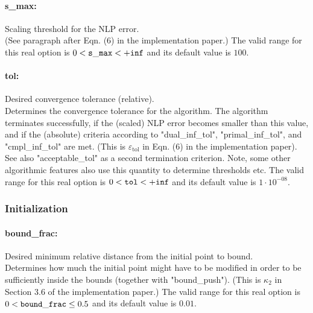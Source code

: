 \paragraph{s\_max:}\label{sec:s_max} Scaling threshold for the NLP error. $\;$ \\
 (See paragraph after Eqn. (6) in the
implementation paper.) The valid range for this real option is 
$0 <  {\tt s\_max } <  {\tt +inf}$
and its default value is $100$.


\paragraph{tol:}\label{sec:tol} Desired convergence tolerance (relative). $\;$ \\
 Determines the convergence tolerance for the
algorithm.  The algorithm terminates
successfully, if the (scaled) NLP error becomes
smaller than this value, and if the (absolute)
criteria according to "dual\_inf\_tol",
"primal\_inf\_tol", and "cmpl\_inf\_tol" are met.
 (This is $\varepsilon_\mathrm{tol}$ in Eqn. (6) in
the implementation paper).  See also
"acceptable\_tol" as a second termination
criterion.  Note, some other algorithmic features
also use this quantity to determine thresholds
etc. The valid range for this real option is 
$0 <  {\tt tol } <  {\tt +inf}$
and its default value is $1 \cdot 10^{-08}$.

\subsubsection{Initialization}
\label{sec:Initialization}

\paragraph{bound\_frac:}\label{sec:bound_frac} Desired minimum relative distance from the initial point to bound. $\;$ \\
 Determines how much the initial point might have
to be modified in order to be sufficiently inside
the bounds (together with "bound\_push").  (This
is $\kappa_2$ in Section 3.6 of the implementation
paper.) The valid range for this real option is 
$0 <  {\tt bound\_frac } \le 0.5$
and its default value is $0.01$.


